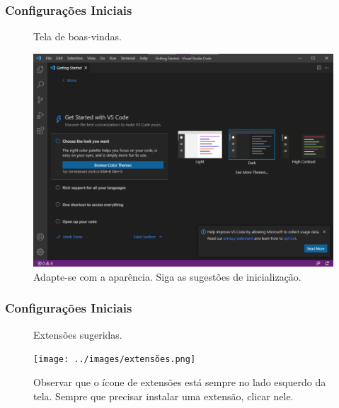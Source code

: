 \documentclass{beamer}
\begin{document}
\begin{frame}
    \frametitle{Configurações Iniciais}
\begin{figure}[h]
    \centering
    \caption{Tela de boas-vindas.}
    \label{fig:welcome_page}
    \includegraphics[width=0.8\textheight]{../images/welcome_page.png}
    \caption*{\footnotesize Adapte-se com a aparência. Siga as sugestões de inicialização.}
\end{figure}
\end{frame}

\begin{frame}
    \frametitle{Configurações Iniciais}
\begin{figure}[h]
    \centering
    \caption{Extensões sugeridas.}
    \label{fig:extensoes}
    \texttt{[image: ../images/extensões.png]}
    \caption*{\footnotesize Observar que o ícone de extensões está sempre no lado esquerdo da tela. Sempre que precisar instalar uma extensão, clicar nele.}
\end{figure}
\end{frame}
\end{document}
